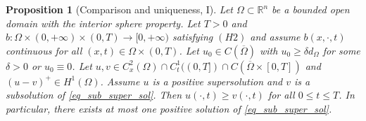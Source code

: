 \documentclass[11pt, reqno]{amsart}
\newtheorem{proposition}[lemma]{Proposition}
\theoremstyle{definition}
\numberwithin{equation}{section}
\newcommand{\Omegabar}{\overline{\Omega}}
\newcommand{\R}{\mathbb{R}}
\begin{document}
\begin{proposition}[Comparison and uniqueness, I]
\label{comparison principle dickstein} 
Let $\Omega \subset \R^n$ be a bounded open domain with the interior sphere property. 
Let $T>0$ and $b\colon\Omega\times(0,+\infty) \times (0,T)\to [0,+\infty)$ satisfying \hyperlink{H2}{\( (H2) \)} and assume $b(x,\cdot,t)$ continuous for all $(x,t)\in \Omega\times(0,T)$.
	Let $u_0\in C(\Omegabar)$ with $u_0\geq \delta d_\Omega$ for some $\delta>0$ or $u_0\equiv 0$. 
	Let $u,v\in C^2_x(\Omega)\cap C^1_t((0,T])\cap C(\Omegabar\times[0,T])$ and $(u-v)^+\in H^1(\Omega)$.
	Assume $u$ is a positive supersolution and $v$ is a subsolution of \eqref{eq_sub_super_sol}.
Then $u(\cdot,t)\geq v(\cdot,t)$ for all $0\leq t\leq T$. 
In particular, there exists at most one positive solution of \eqref{eq_sub_super_sol}.
\end{proposition}
\end{document}

